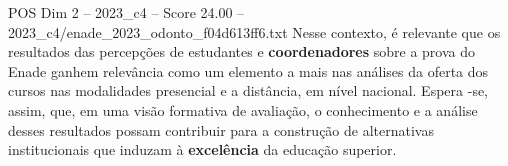 \begin{textsample}{POS Dim 2 – 2023\_c4 – Score 24.00 – 2023\_c4/enade\_2023\_odonto\_f04d613ff6.txt}
Nesse contexto, é relevante que os resultados das percepções de estudantes e \textbf{coordenadores} sobre a prova do Enade ganhem relevância como um elemento a mais nas análises da oferta dos cursos nas modalidades presencial e a distância, em nível nacional.
Espera -se, assim, que, em uma visão formativa de avaliação, o conhecimento e a análise desses resultados possam contribuir para a construção de alternativas institucionais que induzam à \textbf{excelência} da educação superior.

\end{textsample}
